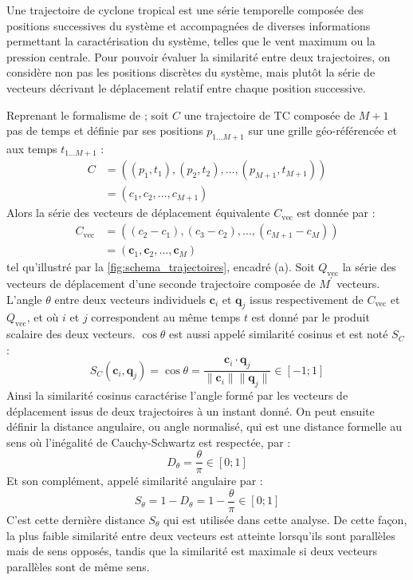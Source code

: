 \documentclass[../main.tex]{subfiles}
\begin{document}
Une trajectoire de cyclone tropical est une série temporelle composée des positions successives du système et accompagnées de diverses informations permettant
la caractérisation du système, telles que le vent maximum ou la pression centrale. Pour pouvoir évaluer la similarité entre deux trajectoires, on considère non
pas les positions discrètes du système, mais plutôt la série de vecteurs décrivant le déplacement relatif entre chaque position successive.

Reprenant le formalisme de \textcite{nakamura_shapebased_2013} ; soit $C$ une trajectoire de TC composée de $M+1$ pas de temps et définie par ses positions
$p_{1...M+1}$ sur une grille géo-référencée et aux temps $t_{1...M+1}$ :
%
\begin{align*}
    C &= ((p_1, t_1), (p_2, t_2), \ldots, (p_{M+1}, t_{M+1}))\\
      &= (c_1, c_2, \ldots, c_{M+1})
\end{align*}
%
Alors la série des vecteurs de déplacement équivalente $C_{\text{vec}}$ est donnée par :
\begin{align*}
    C_{\text{vec}} &= ((c_2 - c_1), (c_3 - c_2), \ldots, (c_{M+1} - c_M))\\
            &= (\mathbf{c}_1, \mathbf{c}_2, \ldots, \mathbf{c}_M)
\end{align*}
%
tel qu'illustré par la \cref{fig:schema_trajectoires}, encadré (a). Soit $Q_{\text{vec}}$ la série des vecteurs de déplacement d'une seconde trajectoire composée de
$M^\prime$ vecteurs. L'angle $\theta$ entre deux vecteurs individuels $\mathbf{c}_i$ et $\mathbf{q}_j$ issus respectivement de $C_{\text{vec}}$ et
$Q_{\text{vec}}$, et où $i$ et $j$ correspondent au même temps $t$ est donné par le produit scalaire des deux vecteurs. $\cos \theta$ est aussi appelé
similarité cosinus et est noté $S_C$ :
%
\begin{equation*}
    S_C(\mathbf{c}_i, \mathbf{q}_j) = \cos \theta = \frac{\mathbf{c}_i \cdot \mathbf{q}_j}{\lVert \mathbf{c}_i \rVert \lVert \mathbf{q}_j \rVert} \in [-1; 1] 
\end{equation*}
%
Ainsi la similarité cosinus caractérise l'angle formé par les vecteurs de déplacement issus de deux trajectoires à un instant donné. On peut ensuite définir la
distance angulaire, ou angle normalisé, qui est une distance formelle au sens où l'inégalité de Cauchy-Schwartz est respectée, par :
%
\begin{equation*}
    D_\theta = \frac{\theta}{\pi} \in [0; 1]
\end{equation*}
%
Et son complément, appelé similarité angulaire par :
%
\begin{equation*}
    S_\theta = 1 - D_\theta = 1 - \frac{\theta}{\pi} \in [0; 1]
\end{equation*}
%
C'est cette dernière distance $S_\theta$ qui est utilisée dans cette analyse. De cette façon, la plus faible similarité entre deux vecteurs est atteinte
lorsqu'ils sont parallèles mais de sens opposés, tandis que la similarité est maximale si deux vecteurs parallèles sont de même sens.
\end{document}
